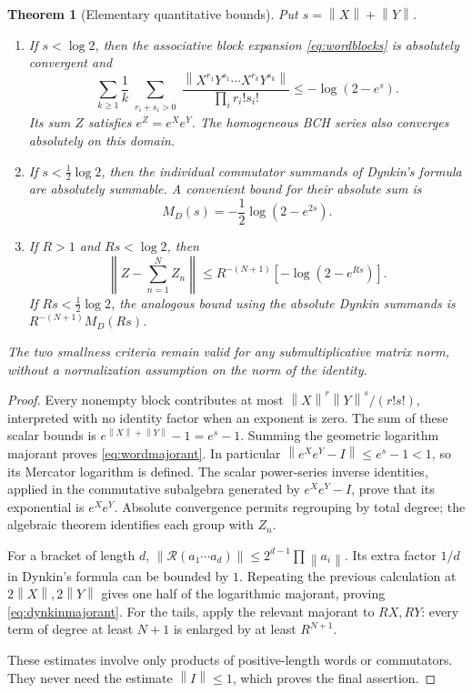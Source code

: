 \documentclass[11pt]{article}
\newtheorem{theorem}{Theorem}[section]
\theoremstyle{definition}
\theoremstyle{remark}
\newcommand{\Rbr}{\mathcal R}
\newcommand{\norm}[1]{\left\lVert #1\right\rVert}
\numberwithin{equation}{section}
\begin{document}
\begin{theorem}[Elementary quantitative bounds]\label{thm:conv}
Put $s=\norm X+\norm Y$.
\begin{enumerate}[label=(\roman*)]
\item If $s<\log2$, then the associative block expansion \eqref{eq:wordblocks} is absolutely convergent and
\begin{equation}\label{eq:wordmajorant}
 \sum_{k\geq1}\frac1k
 \sum_{\substack{r_i+s_i>0}}
 \frac{\norm{X^{r_1}Y^{s_1}\cdots X^{r_k}Y^{s_k}}}
      {\prod_i r_i!s_i!}
 \leq -\log(2-e^s).
\end{equation}
Its sum $Z$ satisfies $e^Z=e^Xe^Y$. The homogeneous BCH series also converges absolutely on this domain.
\item If $s<\tfrac12\log2$, then the individual commutator summands of Dynkin's formula are absolutely summable. A convenient bound for their absolute sum is
\begin{equation}\label{eq:dynkinmajorant}
 M_D(s)=-\frac12\log(2-e^{2s}).
\end{equation}
\item If $R>1$ and $Rs<\log2$, then
\begin{equation}\label{eq:tail}
 \left\|Z-\sum_{n=1}^NZ_n\right\|
 \leq R^{-(N+1)}[-\log(2-e^{Rs})].
\end{equation}
If $Rs<\tfrac12\log2$, the analogous bound using the absolute Dynkin summands is $R^{-(N+1)}M_D(Rs)$.
\end{enumerate}
The two smallness criteria remain valid for any submultiplicative matrix norm, without a normalization assumption on the norm of the identity.
\end{theorem}
\begin{proof}
Every nonempty block contributes at most
$\norm X^r\norm Y^s/(r!s!)$, interpreted with no identity factor when an exponent is zero. The sum of these scalar bounds is $e^{\norm X+\norm Y}-1=e^s-1$. Summing the geometric logarithm majorant proves \eqref{eq:wordmajorant}. In particular $\norm{e^Xe^Y-I}\leq e^s-1<1$, so its Mercator logarithm is defined. The scalar power-series inverse identities, applied in the commutative subalgebra generated by $e^Xe^Y-I$, prove that its exponential is $e^Xe^Y$. Absolute convergence permits regrouping by total degree; the algebraic theorem identifies each group with $Z_n$.

For a bracket of length $d$,
$\norm{\Rbr(a_1\cdots a_d)}\leq2^{d-1}\prod\norm{a_i}$.
Its extra factor $1/d$ in Dynkin's formula can be bounded by $1$. Repeating the previous calculation at $2\norm X,2\norm Y$ gives one half of the logarithmic majorant, proving \eqref{eq:dynkinmajorant}. For the tails, apply the relevant majorant to $RX,RY$: every term of degree at least $N+1$ is enlarged by at least $R^{N+1}$.

These estimates involve only products of positive-length words or commutators. They never need the estimate $\norm{I}\leq1$, which proves the final assertion.
\end{proof}
\end{document}
